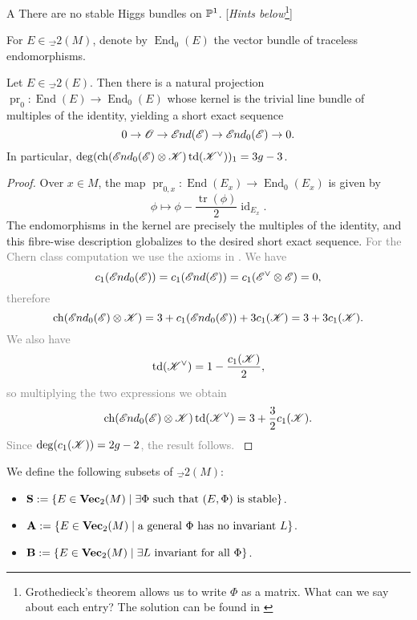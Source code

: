 \documentclass[A4paper, 12pt, british, reqno]{amsart}
\DeclareMathOperator{\End}{End}
\DeclareMathOperator{\id}{id}
\DeclareMathOperator{\tr}{tr}
\DeclareMathOperator{\pr}{pr}
\DeclareMathOperator{\ch}{ch}
\DeclareMathOperator{\td}{td}
\newcommand{\ot}{\otimes}
\newcommand{\dual}{^{\vee}}
\begin{document}
\begin{cexe}{A}
    There are no stable Higgs bundles on $\P^{1}$.
    [\textit{Hints below}\footnote{Grothedieck's theorem allows us to write $\Phi$ as a matrix.
    What can we say about each entry?
    The solution can be found in \cite[Remark (3.2) (iii)]{hit87a}}]
\end{cexe}

\begin{unota}
    For $E\in \Vec_{2}(M)$, denote by $\End_{0}(E)$ the vector bundle of traceless endomorphisms.
\end{unota}

\begin{lm}\label{lm:traceless}
    Let $E\in \Vec_{2}(E)$.
    Then there is a natural projection $\pr_{0}\colon \End(E)\to \End_{0}(E)$ whose kernel is the trivial line bundle of multiples of the identity, yielding a short exact sequence
    \[ 0\to \O\to \sEnd(\E)\to \sEnd_{0}(\E)\to 0. \]
    In particular, $\deg(\ch(\sEnd_{0}(\E)\ot \sK)\td(\sK\dual))_{1}=3g-3$.
    \begin{proof}
	Over $x\in M$, the map $\pr_{0,x}\colon \End(E_{x})\to \End_{0}(E_{x})$ is given by
	\[ \phi\mapsto \phi-\frac{\tr(\phi)}{2}\id_{E_{x}}. \]
	The endomorphisms in the kernel are precisely the multiples of the identity, and this fibre-wise description globalizes to the desired short exact sequence.	
	\textcolor{gray}{%
	For the Chern class computation we use the axioms in \cite[Appendix A]{har77}.
	We have
	\[ c_{1}(\sEnd_{0}(\E))=c_{1}(\sEnd(\E))=c_{1}(\E\dual\ot\E)=0, \]
	therefore
	\[ \ch(\sEnd_{0}(\E)\ot \sK)=3+c_{1}(\sEnd_{0}(\E))+3c_{1}(\sK)=3+3c_{1}(\sK). \]
	We also have
	\[ \td(\sK\dual)=1-\frac{c_{1}(\sK)}{2}, \]
	so multiplying the two expressions we obtain
	\[ \ch(\sEnd_{0}(\E)\ot \sK)\td(\sK\dual)=3+\frac{3}{2}c_{1}(\sK). \]
	Since $\deg(c_{1}(\sK))=2g-2$, the result follows.
	}
    \end{proof}
\end{lm}

\begin{unota}
    We define the following subsets of $\Vec_{2}(M)$:
    \begin{itemize}
	\item $\bfS:=\{ E\in \Vec_{2}(M)\mid \exists \Phi \text{ such that }(E,\Phi)\text{ is stable}\}$.
	\item $\bfA:=\{ E\in \Vec_{2}(M)\mid \text{a general }\Phi\text{ has no invariant }L \}$.
	\item $\bfB:=\{ E\in \Vec_{2}(M)\mid \exists L\text{ invariant for all }\Phi\}$.
    \end{itemize}
\end{unota}
\end{document}
